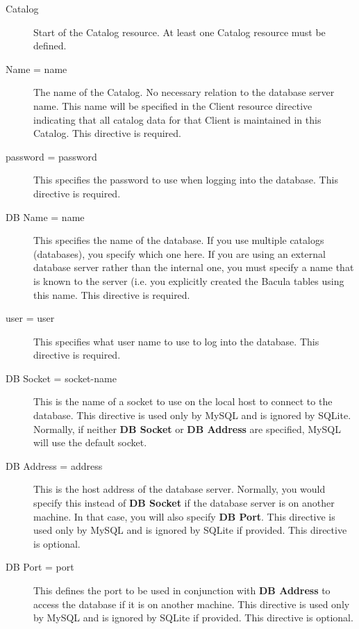 \begin{description}

\item [Catalog]
   Start of the Catalog resource.  At least one Catalog resource must be defined.


\item [Name = \lt{}name\gt{}]
   The name of the Catalog. No  necessary relation to the database server name.
This name  will be specified in the Client resource directive indicating  that
all catalog data for that Client is maintained in this  Catalog. This
directive is required.  

\item [password = \lt{}password\gt{}]
   This specifies the password  to use when logging into the database. This
directive is required.  

\item [DB Name = \lt{}name\gt{}]
   This specifies the name of the  database. If you use multiple catalogs
(databases), you specify  which one here. If you are using an external
database server  rather than the internal one, you must specify a name that 
is known to the server (i.e. you explicitly created the  Bacula tables using
this name. This directive is  required. 

\item [user = \lt{}user\gt{}]
   This specifies what user name  to use to log into the database. This directive
is required.  

\item [DB Socket = \lt{}socket-name\gt{}]
   This is the name of  a socket to use on the local host to connect to the
database.  This directive is used only by MySQL and is ignored by  SQLite.
Normally, if neither {\bf DB Socket} or {\bf DB Address}  are specified, MySQL
will use the default socket.  

\item [DB Address = \lt{}address\gt{}]
   This is the host address  of the database server. Normally, you would specify
this instead  of {\bf DB Socket} if the database server is on another machine.
In that case, you will also specify {\bf DB Port}. This directive  is used
only by MySQL and is ignored by SQLite if provided.  This directive is
optional.  

\item [DB Port = \lt{}port\gt{}]
   This defines the port to  be used in conjunction with {\bf DB Address} to
access the  database if it is on another machine. This directive is used  only
by MySQL and is ignored by SQLite if provided. This  directive is optional.  


\end{description}

